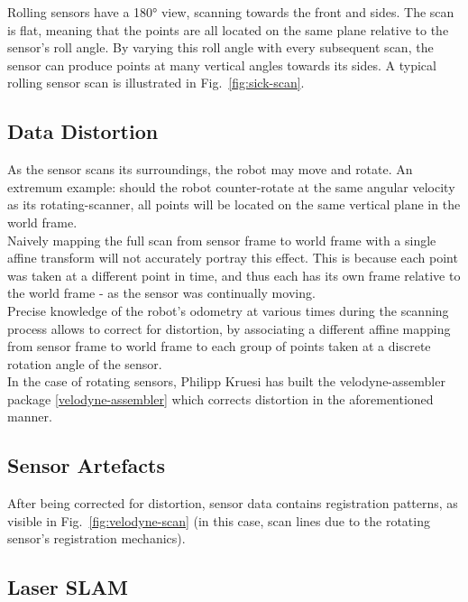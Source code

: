 Rolling sensors have a 180° view, scanning towards the front and sides. The scan is flat, meaning that the points are all located on the same plane relative to the sensor’s roll angle. By varying this roll angle with every subsequent scan, the sensor can produce points at many vertical angles towards its sides. A typical rolling sensor scan is illustrated in Fig.~\ref{fig:sick-scan}.\\ %

\subsection{Data Distortion}
\label{subsec:distortion}

As the sensor scans its surroundings, the robot may move and rotate. An extremum example: should the robot counter-rotate at the same angular velocity as its rotating-scanner, all points will be located on the same vertical plane in the world frame.\\

Naively mapping the full scan from sensor frame to world frame with a single affine transform will not accurately portray this effect. This is because each point was taken at a different point in time, and thus each has its own frame relative to the world frame - as the sensor was continually moving.\\

Precise knowledge of the robot’s odometry at various times during the scanning process allows to correct for distortion, by associating a different affine mapping from sensor frame to world frame to each group of points taken at a discrete rotation angle of the sensor.\\

In the case of rotating sensors, Philipp Kruesi has built the velodyne-assembler package \ref{velodyne-assembler} which corrects distortion in the aforementioned manner.\\ %

\subsection{Sensor Artefacts}
\label{subsec:artefacts}

After being corrected for distortion, sensor data contains registration patterns, as visible in Fig.~\ref{fig:velodyne-scan} (in this case, scan lines due to the rotating sensor's registration mechanics).

\subsection{Laser SLAM}
\label{subsec:SLAM}

